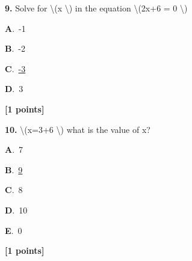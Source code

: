 \documentclass[12pt]{article}
\newcommand{\choice}[3]{%
  \noindent\textbf{#1}.~#2\hfill#3\par\vspace{0.25em}
}
\begin{document}
\noindent \textbf{\textenglish{9.}} {\textenglish{Solve for \textbackslash{}(x \textbackslash{}) in the equation \textbackslash{}(2x+6 = 0 \textbackslash{})}}

\noindent\choice{A}{{\textenglish{-1}}}{}
\noindent\choice{B}{{\textenglish{-2}}}{}
\noindent\choice{C}{\underline{{\textenglish{-3}}}}{}
\noindent\choice{D}{{\textenglish{3}}}{}
\hfill \textbf{[1 points]}\vspace{0.5em}

\noindent \textbf{\textenglish{10.}} {\textenglish{\textbackslash{}(x=3+6 \textbackslash{}) what is the value of x?}}

\noindent\choice{A}{{\textenglish{7}}}{}
\noindent\choice{B}{\underline{{\textenglish{9}}}}{}
\noindent\choice{C}{{\textenglish{8}}}{}
\noindent\choice{D}{{\textenglish{10}}}{}
\noindent\choice{E}{{\textenglish{0}}}{}
\hfill \textbf{[1 points]}\vspace{0.5em}
\end{document}
